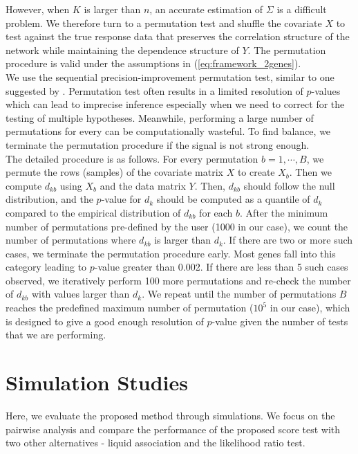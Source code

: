\documentclass[aoas,authoryear, preprint]{imsart}
\numberwithin{equation}{section}
\theoremstyle{plain}
\begin{document}
However, when $K$ is larger than $n$, an accurate estimation of $\Sigma$ is a difficult problem. We therefore turn to a permutation test and shuffle the covariate $X$ to test against the true response data that preserves the correlation structure of the network while maintaining the dependence structure of $Y$. The permutation procedure is valid under the assumptions in (\ref{eq:framework_2genes}). \\

We use the sequential precision-improvement permutation test, similar to one suggested by \cite{chen2012exponential}. Permutation test often results in a limited resolution of $p$-values which can lead to imprecise inference especially when we need to correct for the testing of multiple hypotheses. Meanwhile, performing a large number of permutations for every can be computationally wasteful. To find balance, we terminate the permutation procedure if the signal is not strong enough. \\

The detailed procedure is as follows. For every permutation $b = 1, \cdots, B$, we permute the rows (samples) of the covariate matrix $X$ to create $X_b$. Then we compute $d_{kb}$ using $X_b$ and the data matrix $Y$. Then, $d_{kb}$ should follow the null distribution, and the $p$-value for $d_k$ should be computed as a quantile of $d_k$ compared to the empirical distribution of $d_{kb}$ for each $b$. After the minimum number of permutations pre-defined by the user (1000 in our case), we count the number of permutations where $d_{kb}$ is larger than $d_k$. If there are two or more such cases, we terminate the permutation procedure early. Most genes fall into this category leading to $p$-value greater than 0.002. If there are less than 5 such cases observed, we iteratively perform 100 more permutations and re-check the number of $d_{kb}$ with values larger than $d_k$. We repeat until the number of permutations $B$ reaches the predefined maximum number of permutation ($10^5$ in our case), which is designed to give a good enough resolution of $p$-value given the number of tests that we are performing.

\section{Simulation Studies} \label{simulations}
Here, we evaluate the proposed method through simulations. We focus on the pairwise analysis and compare the performance of the proposed score test with two other alternatives - liquid association and the likelihood ratio test. \\
\end{document}
